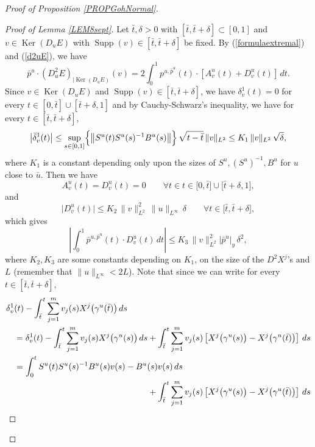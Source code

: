 \documentclass[JEP,XML,SOM,Unicode,NoFloatCountersInSection,published]{cedram}
\DeclareMathOperator{\Ker}{Ker}
\DeclareMathOperator{\Supp}{Supp}
\theoremstyle{definition}
\begin{document}
\begin{proof}[Proof of Proposition \ref{PROPGohNormal}]
\begin{proof}[Proof of Lemma \ref{LEM8sept}]
Let $\bar{t}, \delta>0$ with $[\bar{t},\bar{t}+\delta]\subset [0,1]$ and $v\in \Ker (D_{u} E)$ with $\Supp (v)\in [\bar{t},\bar{t}+\delta]$ be fixed. By (\ref{formulaextremal}) and (\ref{d2uE}), we have
\begin{equation}\label{6avril33}
\bar{p}^u \cdot \left(D^2_{u} E \right)_{\vert \Ker (D_{u} E)} (v) = 2 \int_0^1 p^{u,\bar{p}^u}(t) \cdot \left[ A^u_v(t)+ D^u_v(t)\right] \, dt.
\end{equation}
Since $v\in \Ker (D_{u} E)$ and $\Supp (v)\in [\bar{t},\bar{t}+\delta]$, we have $\delta_v^1(t)=0$ for every $t\in [0,\bar{t}] \cup [\bar{t}+\delta,1]$ and by Cauchy-Schwarz's inequality, we have for every $t\in [\bar{t},\bar{t}+\delta]$,
\begin{equation*}
\left| \bar{\delta}_v^1(t) \right| \leq \sup_{s \in [0,1]} \Bigl\{ \bigl\| S^u(t)S^u(s)^{-1}B^u(s) \bigr\| \Bigr\} \, \sqrt{t-\bar{t}} \, \|v\|_{L^2} \leq K_1 \, \|v\|_{L^2} \, \sqrt{\delta},
\end{equation*}
where $K_1$ is a constant depending only upon the sizes of $S^u, (S^u)^{-1}, B^u$ for $u$ close to $\bar{u}$. Then we have
\[
A^u_v(t)= D^u_v(t)=0 \qquad \forall t \in t \in \bigl[0,\bar{t}\bigr] \cup \bigl[\bar{t}+\delta,1\bigr],
\]
and
\[
\bigl| D^u_v (t) \bigr| \leq K_2 \, \|v\|_{L^2}^2 \, \bigl\| u\bigr\|_{L^{\infty}} \, \delta \qquad \forall t\in \bigl[\bar{t},\bar{t}+\delta\bigr],
\]
which gives
\begin{equation}\label{6avril1}
\left| \int_0^1\bar{p}^{u,\bar{p}^u}(t) \cdot D^u_v(t)\, dt \right| \leq K_3 \, \|v\|_{L^2}^2 \left|\bar{p}^u\right|_y \, \delta^{2} ,
\end{equation}
where $K_2, K_3$ are some constants depending on $K_1$, on the size of the $D^2X^j$'s and $L$ (remember that $\|u\|_{L^{\infty}}<2L$). Note that since we can write for every $t \in[\bar{t},\bar{t}+\delta]$,
\begin{align*}
\delta_v^1& (t) -\int_{\bar{t}}^t \sum_{j=1}^m v_j(s) X^j \bigl(\gamma^u(\bar{t})\bigr) \, ds \\
& =  \delta_v^1 (t) -\int_{\bar{t}}^t \sum_{j=1}^m v_j(s) X^j \bigl(\gamma^u(s)\bigr) \, ds + \int_{\bar{t}}^t \sum_{j=1}^m v_j(s) \left[ X^j \bigl(\gamma^u(s)\bigr) - X^j \bigl(\gamma^u(\bar{t})\bigr)\right] \, ds \\
& =  \int_0^t S^u(t) S^u(s)^{-1} B^u(s) v(s) - B^u(s) v(s) \, ds \\
& \hspace*{5.5cm} + \int_{\bar{t}}^t \sum_{j=1}^m v_j(s) \left[ X^j \bigl(\gamma^u(s)\bigr) - X^j \bigl(\gamma^u(\bar{t})\bigr)\right] \, ds \\

\end{align*}
\end{proof}
\end{proof}
\end{document}
